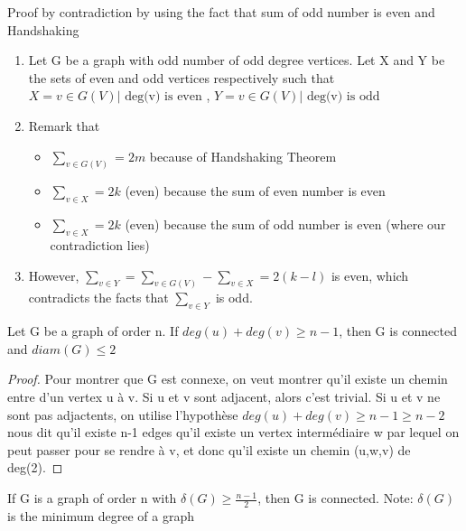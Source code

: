 \documentclass{article}
\begin{document}
\begin{theorem}
    Proof by contradiction by using the fact that sum of odd number is even
    and Handshaking
    \begin{enumerate}
	\item Let G be a graph with odd number of odd degree vertices.
	    Let X and Y be the sets of even and odd vertices respectively
	    such that $ X={v \in G(V)| \text{ deg(v) is even }} $,
	    $ Y={v \in G(V)| \text{ deg(v) is odd}} $
	\item Remark that
	    \begin{itemize}
		\item $ \sum^{}_{v \in G(V)} = 2m$ because of Handshaking Theorem
	    \item $\sum^{}_{v \in X}  = 2k$ (even) because the sum of even
		number is even
	    \item $\sum^{}_{v \in X}  = 2k$ (even) because the sum of odd
		number is even (where our contradiction lies)
	    \end{itemize}
	\item However, $ \sum^{}_{v \in Y} = \sum^{}_{v \in G(V)} -
	\sum^{}_{v \in X} = 2(k-l) $ is even, which contradicts the facts that
	    $\sum^{}_{v \in Y}$ is odd.
    \end{enumerate}
\end{theorem}

\begin{theorem}
    Let G be a graph of order n. If $deg(u)+deg(v) \geq n-1$, then G is
    connected and $diam(G) \leq 2$
\end{theorem}

\begin{proof}
    Pour montrer que G est connexe, on veut montrer qu'il existe un
    chemin entre d'un vertex u à v. Si u et v sont adjacent, alors c'est
    trivial. Si u et v ne sont pas adjactents, on utilise l'hypothèse
    $deg(u)+deg(v) \geq n-1 \geq n-2$ nous dit qu'il existe n-1 edges qu'il
    existe un vertex intermédiaire w par lequel on peut passer pour se
    rendre à v, et donc qu'il existe un chemin (u,w,v) de deg(2).
\end{proof}

\begin{theorem}
    If G is a graph of order n with $\delta(G) \geq \frac{n-1}{2} $,
    then G is connected. Note: $\delta(G)$ is the minimum degree of
    a graph
\end{theorem}
\end{document}
